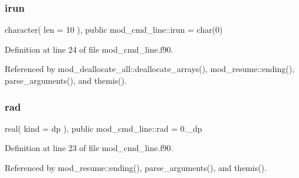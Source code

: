 \subsubsection{\texorpdfstring{irun}{irun}}
{\footnotesize\ttfamily character( len = 10 ), public mod\+\_\+cmd\+\_\+line\+::irun = char(0)}



Definition at line 24 of file mod\+\_\+cmd\+\_\+line.\+f90.



Referenced by mod\+\_\+deallocate\+\_\+all\+::deallocate\+\_\+arrays(), mod\+\_\+resume\+::ending(), parse\+\_\+arguments(), and themis().

\mbox{\label{namespacemod__cmd__line_aaec5fd5d1bccfc9f5d40a72568188667}} 
\subsubsection{\texorpdfstring{rad}{rad}}
{\footnotesize\ttfamily real( kind = dp ), public mod\+\_\+cmd\+\_\+line\+::rad = 0.\+\_\+dp}



Definition at line 23 of file mod\+\_\+cmd\+\_\+line.\+f90.



Referenced by mod\+\_\+resume\+::ending(), parse\+\_\+arguments(), and themis().

